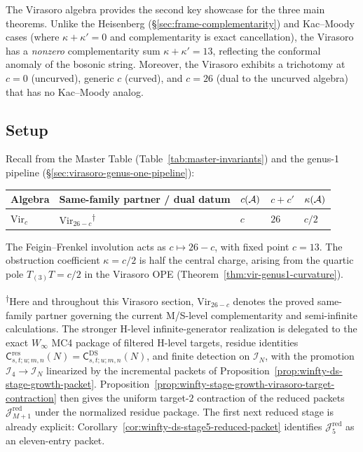 The Virasoro algebra provides the second key showcase for the three main theorems.  Unlike the Heisenberg (\S\ref{sec:frame-complementarity}) and Kac--Moody cases (where $\kappa + \kappa' = 0$ and complementarity is exact cancellation), the Virasoro has a \emph{nonzero} complementarity sum $\kappa + \kappa' = 13$, reflecting the conformal anomaly of the bosonic string.  Moreover, the Virasoro exhibits a trichotomy at $c = 0$ (uncurved), generic $c$ (curved), and $c = 26$ (dual to the uncurved algebra) that has no Kac--Moody analog.

\subsection{Setup}\label{subsec:vir-genus-setup}

Recall from the Master Table (Table~\ref{tab:master-invariants}) and the genus-1 pipeline (\S\ref{sec:virasoro-genus-one-pipeline}):

\begin{center}
\renewcommand{\arraystretch}{1.4}
\begin{tabular}{lllll}
\toprule
Algebra & Same-family partner / dual datum & $c(\mathcal{A})$ & $c + c'$ & $\kappa(\mathcal{A})$ \\
\midrule
$\mathrm{Vir}_c$ & $\mathrm{Vir}_{26-c}$\textsuperscript{$\dagger$} & $c$ & $26$ & $c/2$ \\[4pt]
\bottomrule
\end{tabular}
\end{center}
The Feigin--Frenkel involution acts as $c \mapsto 26 - c$, with fixed
point $c = 13$.  The obstruction coefficient $\kappa = c/2$ is half
the central charge, arising from the quartic pole $T_{(3)}T = c/2$ in
the Virasoro OPE (Theorem~\ref{thm:vir-genus1-curvature}).

\textsuperscript{$\dagger$}Here and throughout this Virasoro section,
$\mathrm{Vir}_{26-c}$ denotes the proved same-family partner governing
the current M/S-level complementarity and semi-infinite calculations.
The stronger H-level infinite-generator realization is delegated to the
exact $W_\infty$ MC4 package of filtered H-level targets, residue
identities
$\mathsf{C}^{\mathrm{res}}_{s,t;u;m,n}(N)
=\mathsf{C}^{\mathrm{DS}}_{s,t;u;m,n}(N)$,
and finite detection on $\mathcal{I}_N$, with the promotion
$\mathcal{I}_4\to\mathcal{I}_N$ linearized by the incremental packets
of Proposition~\ref{prop:winfty-ds-stage-growth-packet}.
Proposition~\ref{prop:winfty-stage-growth-virasoro-target-contraction}
then gives the uniform target-$2$ contraction of the reduced packets
$\mathcal{J}_{M+1}^{\mathrm{red}}$ under the normalized residue
package.  The first next reduced stage is already explicit:
Corollary~\ref{cor:winfty-ds-stage5-reduced-packet} identifies
$\mathcal{J}_5^{\mathrm{red}}$ as an eleven-entry packet.

